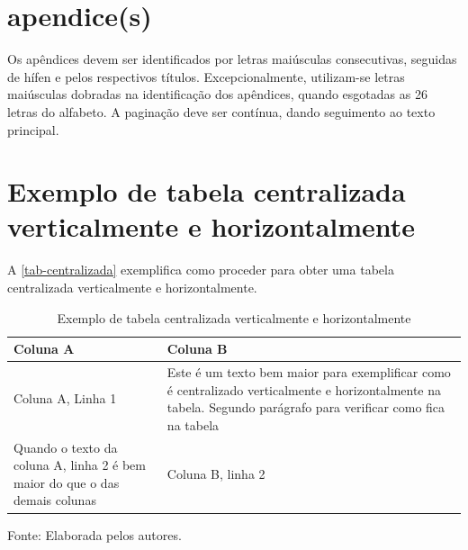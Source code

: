
\begin{apendicesenv}
\partapendices
\chapter{apendice(s)}

Os apêndices devem ser identificados por letras maiúsculas consecutivas, seguidas de hífen e pelos respectivos títulos. Excepcionalmente, utilizam-se letras maiúsculas dobradas na identificação dos apêndices, quando esgotadas as 26 letras do alfabeto. A paginação deve ser contínua, dando seguimento ao texto principal. \cite{aguia2020}
\chapter{Exemplo de tabela centralizada verticalmente e horizontalmente}
A \autoref{tab-centralizada} exemplifica como proceder para obter uma tabela centralizada verticalmente e horizontalmente.
\begin{table}[htb]
\ABNTEXfontereduzida
\caption[Exemplo de tabela centralizada verticalmente e horizontalmente]{Exemplo de tabela centralizada verticalmente e horizontalmente}
\label{tab-centralizada}

\begin{tabular}{ >{\centering\arraybackslash}m{6cm}  >{\centering\arraybackslash}m{6cm} }
\hline
 \centering \textbf{Coluna A} & \textbf{Coluna B}\\
\hline
  Coluna A, Linha 1 & Este é um texto bem maior para exemplificar como é centralizado verticalmente e horizontalmente na tabela. Segundo parágrafo para verificar como fica na tabela\\
  Quando o texto da coluna A, linha 2 é bem maior do que o das demais colunas  & Coluna B, linha 2\\
\hline
\end{tabular}
\begin{flushleft}
		Fonte: Elaborada pelos autores.\
\end{flushleft}
\end{table}


\end{apendicesenv}
